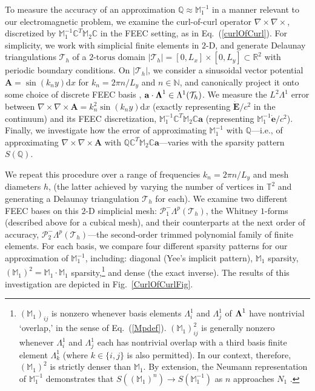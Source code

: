 \documentclass[final,twocolumn]{elsarticle}
\newcommand{\w}[1]{\ensuremath{\mathbf{#1}}} %
\newcommand{\gv}[1]{\ensuremath{\mbox{\boldmath$ #1 $}}}
\newcommand{\abs}[1]{\left| #1 \right|} %
\newcommand*\mC{\mathbb{C}}
\newcommand*\mM{\mathbb{M}}
\newcommand*\mN{\mathbb{N}}
\newcommand*\mQ{\mathbb{Q}}
\newcommand*\mmP{\mathcal{P}}
\newcommand*\mR{\mathbb{R}}
\newcommand*\mT{\mathcal{T}}
\newcommand*\mmT{\mathbb{T}}
\newcommand*\md{\mathrm{d}}
\begin{document}
To measure the accuracy of an approximation ${\mQ\approx\mM_1^{-1}}$ in a manner relevant to our electromagnetic problem, we examine the curl-of-curl operator ${\nabla\times\nabla\times}$, discretized by ${\mM_1^{-1}\mC^T\mM_2\mC}$ in the FEEC setting, as in Eq.~(\ref{curlOfCurl}). For simplicity, we work with simplicial finite elements in ${\text{2-D}}$, and generate Delaunay triangulations ${\mT_h}$ of a ${\text{2-torus}}$ domain ${\abs{\mT_h}=[0,L_x]\times[0,L_y]\subset\mR^2}$ with periodic boundary conditions. On $\abs{\mT_h}$, we consider a sinusoidal vector potential ${\w{A}=\sin(k_ny)\md x}$ for ${k_n=2\pi n/L_y}$ and ${n\in\mN}$, and canonically project it onto some choice of discrete FEEC basis \cite{arnold_finite_2006}, ${\w{a}\cdot\gv{\Lambda}^1\in\Lambda^1(\mT_h)}$. We measure the ${L^2\Lambda^1}$ error between ${\nabla\times\nabla\times\w{A}=k_n^2\sin(k_ny)\md x}$ (exactly representing ${\dot{\w{E}}/c^2}$ in the continuum) and its FEEC discretization, ${\mM_1^{-1}\mC^T\mM_2\mC\w{a}}$ (representing ${\mM_1^{-1}\dot{\w{e}}/c^2}$). Finally, we investigate how the error of approximating ${\mM_1^{-1}}$ with $\mQ$---i.e., of approximating ${\nabla\times\nabla\times\w{A}}$ with ${\mQ\mC^T\mM_2\mC\w{a}}$---varies with the sparsity pattern ${S(\mQ)}$.

We repeat this procedure over a range of frequencies ${k_n=2\pi n/L_y}$ and mesh diameters $h$, (the latter achieved by varying the number of vertices in $\mmT^2$ and generating a Delaunay triangulation $\mT_h$ for each). We examine two different FEEC bases on this ${\text{2-D}}$ simplicial mesh: ${\mmP_1^-\Lambda^p(\mT_h)}$, the Whitney $\text{1-form}$s (described above for a cubical mesh), and their counterparts at the next order of accuracy, ${\mmP_2^-\Lambda^p(\mT_h)}$---the second-order trimmed polynomial family of finite elements. For each basis, we compare four different sparsity patterns for our approximation of ${\mM_1^{-1}}$, including: diagonal (Yee's implicit pattern), $\mM_1$ sparsity, ${(\mM_1)^2=\mM_1\cdot\mM_1}$ sparsity,\footnote{${(\mM_1)_{ij}}$ is nonzero whenever basis elements $\Lambda^1_i$ and $\Lambda^1_j$  of $\gv{\Lambda}^1$ have nontrivial `overlap,' in the sense of Eq.~(\ref{Mpdef}). ${(\mM_1)^2_{ij}}$ is generally nonzero whenever $\Lambda^1_i$ and $\Lambda^1_j$ each has nontrivial overlap with a third basis finite element $\Lambda^1_k$ (where ${k\in\{i,j\}}$ is also permitted). In our context, therefore, ${(\mM_1)^2}$ is strictly denser than $\mM_1$. By extension, the Neumann representation of $\mM_1^{-1}$ demonstrates that ${S((\mM_1)^n)\rightarrow S(\mM_1^{-1})}$ as $n$ approaches $N_1$ \cite{huckle_approximate_1998}.} and dense (the exact inverse). The results of this investigation are depicted in Fig.~\ref{CurlOfCurlFig}.
\end{document}
